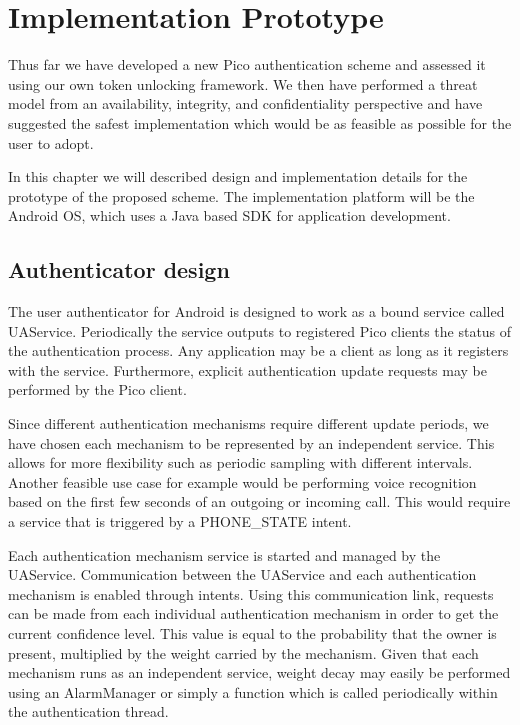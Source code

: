 
\chapter{Implementation Prototype} %

\label{Chapter5} %


Thus far we have developed a new Pico authentication scheme and assessed it using our own token unlocking framework. We then have performed a threat model from an availability, integrity, and confidentiality perspective and have suggested the safest implementation which would be as feasible as possible for the user to adopt.

In this chapter we will described design and implementation details for the prototype of the proposed scheme. The implementation platform will be the Android OS, which uses a Java based SDK for application development.

\section{Authenticator design}
The user authenticator for Android is designed to work as a bound service called UAService. Periodically the service outputs to registered Pico clients the status of the authentication process. Any application may be a client as long as it registers with the service. Furthermore, explicit authentication update requests may be performed by the Pico client.

Since different authentication mechanisms require different update periods, we have chosen each mechanism to be represented by an independent service. This allows for more flexibility such as periodic sampling with different intervals. Another feasible use case for example would be performing voice recognition based on the first few seconds of an outgoing or incoming call. This would require a service that is triggered by a PHONE\_STATE intent.

Each authentication mechanism service is started and managed by the UAService. Communication between the UAService and each authentication mechanism is enabled through intents. Using this communication link, requests can be made from each individual authentication mechanism in order to get the current confidence level. This value is equal to the probability that the owner is present, multiplied by the weight carried by the mechanism. Given that each mechanism runs as an independent service, weight decay may easily be performed using an AlarmManager or simply a function which is called periodically within the authentication thread.

